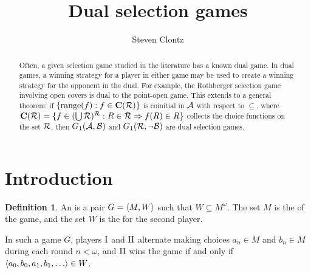 \documentclass{amsart}
\theoremstyle{plain}
\theoremstyle{definition}
\newtheorem{definition}[theorem]{Definition}
\theoremstyle{remark}
\theoremstyle{plain}
\theoremstyle{definition}
\theoremstyle{remark}
\begin{document}
\title{Dual selection games}



\author{Steven Clontz}
\address{Department of Mathematics and Statistics,
The University of South Alabama,
Mobile, AL 36688}







\begin{abstract}
  Often, a given selection game studied in the literature has
  a known dual game. In dual games, a winning
  strategy for a player in either game may be used to create
  a winning strategy for the opponent in the dual. 
  For example, the Rothberger selection game involving open covers
  is dual to the point-open game. This extends to a general
  theorem: if \(\{\text{range}(f):f\in\mathbf C(\mathcal{R})\}\) is coinitial in \(\mathcal{A}\)
  with respect to \(\subseteq\),
  where \(\mathbf C(\mathcal{R})=\{f\in(\bigcup\mathcal{R})^{\mathcal{R}}:R\in\mathcal{R}\Rightarrow f(R)\in R\}\) 
  collects the choice functions on the set \(\mathcal{R}\),
  then \(G_1(\mathcal{A},\mathcal{B})\) and \(G_1(\mathcal{R},\neg\mathcal{B})\)
  are dual selection games. 
\end{abstract}


\maketitle







\section{Introduction}

\begin{definition}
  An  is a pair \(G=\langle M,W\rangle\) such that
  \(W\subseteq M^\omega\). The set \(M\) is the  of the game,
  and the set \(W\) is the  for the second player.
\end{definition}

In such a game \(G\), players \(\mathrm{I}\) and \(\mathrm{II}\) alternate making choices
\(a_n\in M\) and \(b_n\in M\) during each round \(n<\omega\), 
and \(\mathrm{II}\) wins the game if and only if \(\<a_0,b_0,a_1,b_1,\dots\>\in W\).
\end{document}
